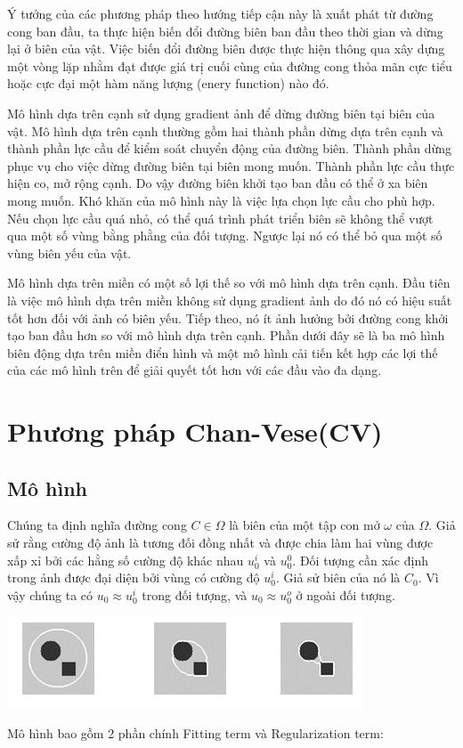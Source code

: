 \documentclass[12pt,oneside,a4]{report}
\begin{document}
Ý tưởng của các phương pháp theo hướng tiếp cận này là xuất phát từ đường cong ban đầu, ta thực hiện biến đổi đường biên ban đầu theo thời gian  và dừng lại ở biên của vật. Việc biến đổi đường biên được thực hiện thông qua xây dựng một vòng lặp nhằm đạt được giá trị cuối cùng của đường cong thỏa mãn cực tiểu hoặc cực đại một hàm năng lượng (enery function) nào đó.

Mô hình dựa trên cạnh sử dụng gradient ảnh để dừng đường biên tại biên của vật. Mô hình dựa trên cạnh thường gồm hai thành phần dừng dựa trên cạnh  và thành phần lực cầu để kiểm soát chuyển động của đường biên. Thành phần dừng phục vụ cho việc dừng đường biên tại biên mong muốn. Thành phần lực cầu thực hiện co, mở rộng cạnh. Do vậy đường biên khởi tạo ban đầu có thể ở xa biên mong muốn. Khó khăn của mô hình này là việc lựa chọn lực cầu cho phù hợp. Nếu chọn lực cầu quá nhỏ, có thể quá trình phát triển biên sẽ không thể vượt qua một số vùng bằng phằng của đối tượng. Ngược lại nó có thể bỏ qua một số vùng biên yếu của vật.

Mô hình dựa trên miền có một số lợi thế so với mô hình dựa trên cạnh. Đầu tiên là việc mô hình dựa trên miền không sử dụng gradient ảnh do đó nó có hiệu suất tốt hơn đối với ảnh có biên yếu. Tiếp theo, nó ít ảnh hưởng bởi đường cong khởi tạo ban đầu hơn so với mô hình dựa trên cạnh.  Phần dưới đây sẽ là ba mô hình biên động dựa trên miền điển hình và một mô hình cải tiến kết hợp các lợi thế của các mô hình trên để giải quyết tốt hơn với các đầu vào đa dạng.
\section{Phương pháp Chan-Vese(CV)}


\subsection{Mô hình}
Chúng ta định nghĩa đường cong $C\in \Omega$ là biên của một tập con mở $\omega$ của $\Omega$. Giả sử rằng cường độ ảnh là tương đối đồng nhất và được chia làm hai vùng được xấp xỉ bởi các hằng số cường độ khác nhau $u_0^i$ và $u_0^0$. Đối tượng cần xác định trong ảnh được đại diện bởi vùng có cường độ $u_0^i$. Giả sử biên của nó là $C_0$. Vì vậy chúng ta có $u_0\approx u_0^i$ trong đối tượng, và $u_0\approx u_0^o$ ở ngoài đối tượng.
\begin{center}
\includegraphics[scale=1]{figure/ytuong.png}
\end{center}
Mô hình bao gồm 2 phần chính Fitting term và Regularization term: 
\end{document}

